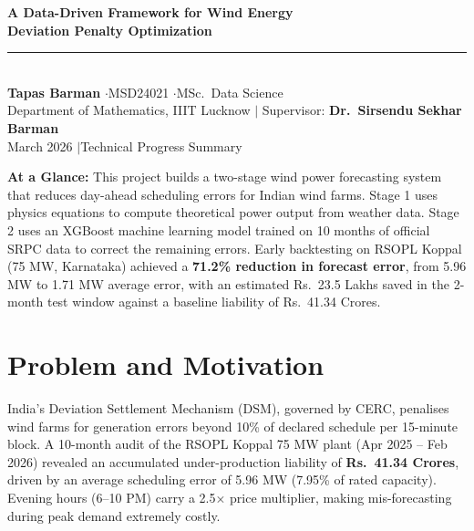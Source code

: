\documentclass[11pt,a4paper]{article}
\begin{document}
\begin{center}
  {\LARGE\bfseries\color{darkblue}
    A Data-Driven Framework for Wind Energy\\[0.3em]
    Deviation Penalty Optimization}\\[0.6em]
  \rule{0.6\linewidth}{0.5pt}\\[0.4em]
  {\normalsize\textbf{Tapas Barman} \enspace$\cdot$\enspace MSD24021
    \enspace$\cdot$\enspace MSc.\ Data Science}\\[0.2em]
  {\small Department of Mathematics, IIIT Lucknow
    \enspace$|$\enspace
    Supervisor: \textbf{Dr.\ Sirsendu Sekhar Barman}}\\[0.2em]
  {\small March 2026 \enspace$|$\enspace Technical Progress Summary}
\end{center}
\vspace{0.3cm}

\begin{infobox}
\small
\textbf{At a Glance:}
This project builds a two-stage wind power forecasting system that reduces day-ahead scheduling errors for Indian wind farms. Stage 1 uses physics equations to compute theoretical power output from weather data. Stage 2 uses an XGBoost machine learning model trained on 10 months of official SRPC data to correct the remaining errors. Early backtesting on RSOPL Koppal (75 MW, Karnataka) achieved a \textbf{71.2\% reduction in forecast error}, from 5.96 MW to 1.71 MW average error, with an estimated Rs.\ 23.5 Lakhs saved in the 2-month test window against a baseline liability of Rs.\ 41.34 Crores.
\end{infobox}

\vspace{0.3cm}

\section{Problem and Motivation}

India's Deviation Settlement Mechanism (DSM), governed by CERC, penalises wind farms for generation errors beyond 10\% of declared schedule per 15-minute block. A 10-month audit of the RSOPL Koppal 75 MW plant (Apr 2025 -- Feb 2026) revealed an accumulated under-production liability of \textbf{Rs.\ 41.34 Crores}, driven by an average scheduling error of 5.96 MW (7.95\% of rated capacity). Evening hours (6--10 PM) carry a 2.5$\times$ price multiplier, making mis-forecasting during peak demand extremely costly.
\end{document}
